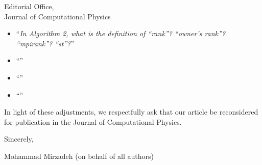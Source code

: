 \documentclass{scrlttr2}
\begin{document}
\begin{letter} {Editorial Office, \\ Journal of Computational Physics}
\begin{itemize}
\begin{itemize}
Our library is coded in `\texttt{c++}' (with a mix of little `\texttt{c}' code). We have made adjustments to the to algorithms to make them easier to understand. However, we believe it is best not to directly use a `\texttt{c++}' syntax to keep the pseudo-code language-agnostic and accessible to all readers.

\item ``\textit{In Algorithm 2, what is the definition of “rank”? “owner’s rank”? “mpirank”? “st”?}''

\item ``\textit{}''

\item ``\textit{}''

\item ``\textit{}''
\end{itemize}
\end{itemize}


In light of these adjustments, we respectfully ask that our article be reconsidered for publication in the Journal of Computational Physics.
\closing{Sincerely,}
Mohammad Mirzadeh (on behalf of all authors)
\end{letter}
\end{document}
